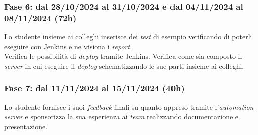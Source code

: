 \subsubsection*{Fase 6: dal 28/10/2024 al 31/10/2024 e dal 04/11/2024 al 08/11/2024 (72h)}
Lo studente insieme ai colleghi inserisce dei \emph{test} di esempio verificando di poterli eseguire con Jenkins e ne visiona i \emph{report}.\\
Verifica le possibilità di \emph{deploy} tramite Jenkins. Verifica come sia composto il \emph{server} in cui eseguire il \emph{deploy} schematizzando le sue parti insieme ai colleghi.\\

\subsubsection*{Fase 7: dal 11/11/2024 al 15/11/2024 (40h) }
Lo studente fornisce i suoi \emph{feedback} finali su quanto appreso tramite l'\emph{automation server} e sponsorizza la sua esperienza ai \emph{team} realizzando documentazione e presentazione.\\

